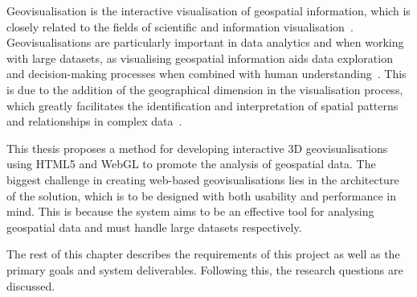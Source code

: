 
Geovisualisation is the interactive visualisation of geospatial information, which is closely related to the fields of scientific and information visualisation~\parencite{jiang2005geovisualization}. Geovisualisations are particularly important in data analytics and when working with large datasets, as visualising geospatial information aids data exploration and decision-making processes when combined with human understanding~\parencite{grinstein2002introduction, hendley1995case}. This is due to the addition of the geographical dimension in the visualisation process, which greatly facilitates the identification and interpretation of spatial patterns and relationships in complex data~\parencite{kwan2004geovisualization}.

This thesis proposes a method for developing interactive 3D geovisualisations using HTML5 and WebGL to promote the analysis of geospatial data. The biggest challenge in creating web-based geovisualisations lies in the architecture of the solution, which is to be designed with both usability and performance in mind. This is because the system aims to be an effective tool for analysing geospatial data and must handle large datasets respectively.

The rest of this chapter describes the requirements of this project as well as the primary goals and system deliverables. Following this, the research questions are discussed.

